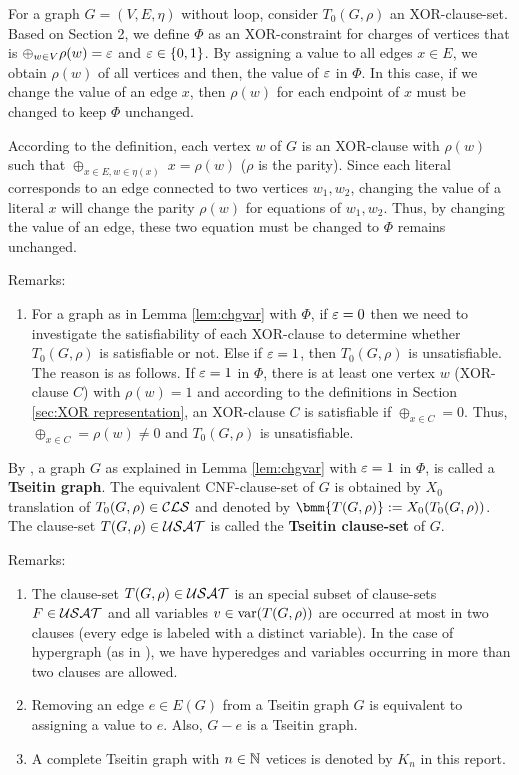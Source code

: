 \documentclass{report}
\begin{document}
\begin{lem}\label{lem:chgvar}
 For a graph $G=(V,E,\eta)$ without loop, consider $T_0(G,\rho)$ an XOR-clause-set. Based on \cite{Ts68} Section 2, we define $\Phi$ as an XOR-constraint for charges of vertices that is $\oplus_{w \in V} \rho(w) = \varepsilon$ and $\varepsilon \in \{ 0,1 \}$. By assigning a value to all edges $x \in E$, we obtain $\rho(w)$ of all vertices and then, the value of $\varepsilon$ in $\Phi$. In this case, if we change the value of an edge $x$, then $\rho(w)$ for each endpoint of $x$ must be changed to keep $\Phi$ unchanged.
\end{lem}
\begin{prf}
According to the definition, each vertex $w$ of $G$ is an XOR-clause with $\rho(w)$ such that  $\oplus_{x \in E, w \in \eta(x)} \; x = \rho(w)$ ($\rho$ is the parity). Since each literal corresponds to an edge connected to two vertices $w_1, w_2$, changing the value of a literal $x$ will change the parity $\rho(w)$ for equations of $w_1, w_2$. Thus, by changing the value of an edge, these two equation must be changed to $\Phi$ remains unchanged.
\end{prf}
Remarks:
  \begin{enumerate}
  \item For a graph as in Lemma \ref{lem:chgvar} with $\Phi$, if $\varepsilon=0$ then we need to investigate the satisfiability of each XOR-clause to determine whether $T_0(G,\rho)$ is satisfiable or not. Else if $\varepsilon=1$, then $T_0(G,\rho)$ is unsatisfiable. The reason is as follows. If $\varepsilon=1$ in $\Phi$, there is at least one vertex $w$ (XOR-clause $C$) with $ \rho(w) =1$ and according to the definitions in Section \ref{sec:XOR representation}, an XOR-clause $C$ is satisfiable if $\oplus_{x \in C} = 0$. Thus, $\oplus_{x \in C} = \rho(w) \not =0$ and $T_0(G,\rho)$ is unsatisfiable.
  \end{enumerate}

\begin{defi}\label{def:tseitindef}
By \cite{GwynneKullmann2013GoodRepresentationsIIex}, a graph $G$ as explained in Lemma \ref{lem:chgvar} with $\varepsilon=1$ in $\Phi$, is called a \textbf{Tseitin graph}. The equivalent CNF-clause-set of $G$ is obtained by $X_0$ translation of $T_0(G,\rho) \in \mathcal{CLS}$ and denoted by $\bmm{T(G,\rho)} := X_0(T_0(G,\rho))$. The clause-set $T(G,\rho) \in \mathcal{USAT}$ is called the \textbf{Tseitin clause-set} of $G$.
\end{defi}
Remarks:
  \begin{enumerate}
  \item The clause-set $T(G,\rho) \in \mathcal{USAT}$ is an special subset of clause-sets $F \in \mathcal{USAT}$ and all variables $v \in \operatorname{var}(T(G,\rho) )$ are occurred at most in two clauses (every edge is labeled with a distinct variable). In the case of hypergraph (as in \cite{BeyersdorffGwynneKullmann2013PHPER}), we have hyperedges and variables occurring in more than two clauses are allowed.
  \item Removing an edge $e \in E(G)$ from a Tseitin graph $G$ is equivalent to assigning a value to $e$. Also, $G-e$ is a Tseitin graph.
  \item A complete Tseitin graph with $n \in \mathbb{N}$ vetices is denoted by $K_n$ in this report.
\end{enumerate}
\end{document}
